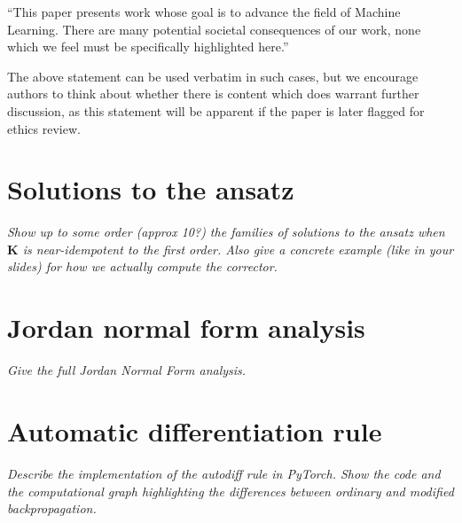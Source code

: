 \documentclass{article}
\theoremstyle{plain}
\theoremstyle{definition}
\theoremstyle{remark}
\newcommand{\vK}{\mathbf{K}}
\begin{document}
``This paper presents work whose goal is to advance the field of
Machine Learning. There are many potential societal consequences
of our work, none which we feel must be specifically highlighted here.''

The above statement can be used verbatim in such cases, but we
encourage authors to think about whether there is content which does
warrant further discussion, as this statement will be apparent if the
paper is later flagged for ethics review.







\newpage
\appendix
\onecolumn

\section{Solutions to the ansatz}
\label{app:solutions}
\textit{Show up to some order (approx 10?) the families of solutions to the ansatz when $\vK$ is near-idempotent to the first order. Also give a concrete example (like in your slides) for how we actually compute the corrector.}

\section{Jordan normal form analysis}
\label{app:jordan}
\textit{Give the full Jordan Normal Form analysis.}

\section{Automatic differentiation rule}
\label{app:autodiff-rule}
\textit{Describe the implementation of the autodiff rule in PyTorch. Show the code and the computational graph highlighting the differences between ordinary and modified backpropagation.}
\end{document}
